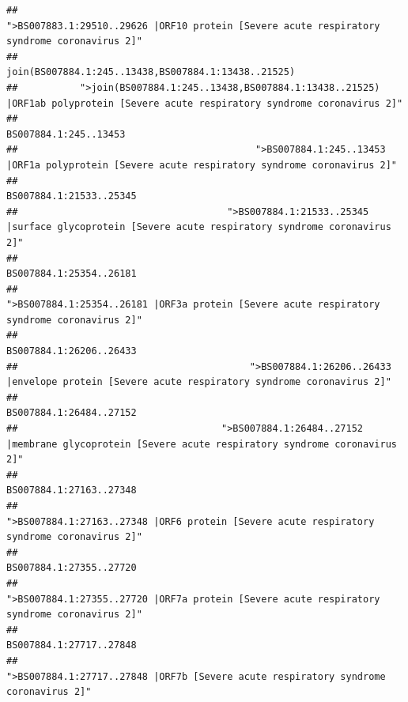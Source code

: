 \documentclass[
]{article}
\begin{document}
\begin{verbatim}
##                                            ">BS007883.1:29510..29626 |ORF10 protein [Severe acute respiratory syndrome coronavirus 2]" 
##                                                                                    join(BS007884.1:245..13438,BS007884.1:13438..21525) 
##           ">join(BS007884.1:245..13438,BS007884.1:13438..21525) |ORF1ab polyprotein [Severe acute respiratory syndrome coronavirus 2]" 
##                                                                                                                  BS007884.1:245..13453 
##                                          ">BS007884.1:245..13453 |ORF1a polyprotein [Severe acute respiratory syndrome coronavirus 2]" 
##                                                                                                                BS007884.1:21533..25345 
##                                     ">BS007884.1:21533..25345 |surface glycoprotein [Severe acute respiratory syndrome coronavirus 2]" 
##                                                                                                                BS007884.1:25354..26181 
##                                            ">BS007884.1:25354..26181 |ORF3a protein [Severe acute respiratory syndrome coronavirus 2]" 
##                                                                                                                BS007884.1:26206..26433 
##                                         ">BS007884.1:26206..26433 |envelope protein [Severe acute respiratory syndrome coronavirus 2]" 
##                                                                                                                BS007884.1:26484..27152 
##                                    ">BS007884.1:26484..27152 |membrane glycoprotein [Severe acute respiratory syndrome coronavirus 2]" 
##                                                                                                                BS007884.1:27163..27348 
##                                             ">BS007884.1:27163..27348 |ORF6 protein [Severe acute respiratory syndrome coronavirus 2]" 
##                                                                                                                BS007884.1:27355..27720 
##                                            ">BS007884.1:27355..27720 |ORF7a protein [Severe acute respiratory syndrome coronavirus 2]" 
##                                                                                                                BS007884.1:27717..27848 
##                                                    ">BS007884.1:27717..27848 |ORF7b [Severe acute respiratory syndrome coronavirus 2]" 

\end{verbatim}
\end{document}
